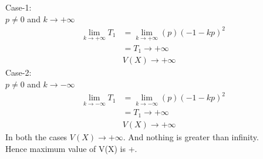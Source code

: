 \documentclass[journal,12pt,twocolumn]{IEEEtran}
\begin{document}
Case-1:\\
$p{\neq}0$ and $k{\rightarrow}+\infty$
\begin{align}
    \lim_{k{\rightarrow}+\infty}T_1&= \lim_{k{\rightarrow}+\infty}(p)(-1-kp)^2\\
    &=T_1{\rightarrow}{+\infty}\\
    &V(X){\rightarrow}{+\infty}
\end{align}
Case-2:\\
$p{\neq}0$ and $k{\rightarrow}-\infty$
\begin{align}
    \lim_{k{\rightarrow}-\infty}T_1&= \lim_{k{\rightarrow}-\infty}(p)(-1-kp)^2\\
    &=T_1{\rightarrow}{+\infty}\\
    &V(X){\rightarrow}{+\infty}
\end{align}
In both the cases $V(X){\rightarrow}{+\infty}$. And nothing is greater than infinity.\\
Hence maximum value of V(X) is +\infty.\\
\end{document}
